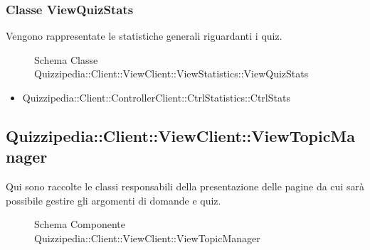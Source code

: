 \subsubsection{Classe ViewQuizStats}
Vengono rappresentate le statistiche generali riguardanti i quiz.
\begin{figure}[H]
\centering
\noindent{}
\caption[Schema Classe ViewQuizStats]{Schema Classe Quizzipedia::Client::ViewClient::ViewStatistics::ViewQuizStats}
\end{figure}
\begin{itemize}
\item Quizzipedia::Client::ControllerClient::CtrlStatistics::CtrlStats
\end{itemize}
\subsection{Quizzipedia::Client::ViewClient::ViewTopicManager}
Qui sono raccolte le classi responsabili della presentazione delle pagine da cui sarà possibile gestire gli argomenti di domande e quiz.
\begin{figure}[H]
\centering
\noindent{}
\caption[Schema Componente Quizzipedia::Client::ViewClient::ViewTopicManager]{Schema Componente Quizzipedia::Client::ViewClient::ViewTopicManager}
\end{figure}
